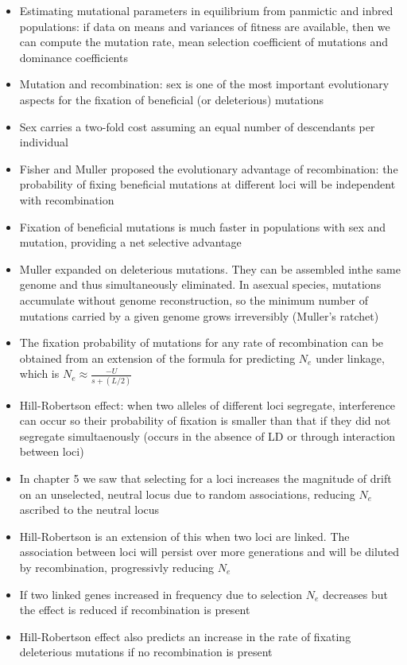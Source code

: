 \documentclass[12pt]{amsart}
\begin{document}
\begin{itemize}
\item Estimating mutational parameters in equilibrium from panmictic and inbred populations: if data on means and variances of fitness are available, then we can compute the mutation rate, mean selection coefficient of mutations and dominance coefficients
\item Mutation and recombination: sex is one of the most important evolutionary aspects for the fixation of beneficial (or deleterious) mutations
\item Sex carries a two-fold cost assuming an equal number of descendants per individual
\item Fisher and Muller proposed the evolutionary advantage of recombination: the probability of fixing beneficial mutations at different loci will be independent with recombination
\item Fixation of beneficial mutations is much faster in populations with sex and mutation, providing a net selective advantage
\item Muller expanded on deleterious mutations. They can be assembled inthe same genome and thus simultaneously eliminated. In asexual species, mutations accumulate without genome reconstruction, so the minimum number of mutations carried by a given genome grows irreversibly (Muller's ratchet) 
\item The fixation probability of mutations for any rate of recombination can be obtained from an extension of the formula for predicting $N_e$ under linkage, which is $N_e \approx\frac{-U}{s + (L/2)}$
\item Hill-Robertson effect: when two alleles of different loci segregate, interference can occur so their probability of fixation is smaller than that if they did not segregate simultaenously (occurs in the absence of LD or through interaction between loci)
\item In chapter 5 we saw that selecting for a loci increases the magnitude of drift on an unselected, neutral locus due to random associations, reducing $N_e$ ascribed to the neutral locus 
\item Hill-Robertson is an extension of this when two loci are linked. The association between loci will persist over more generations and will be diluted by recombination, progressivly reducing $N_e$
\item If two linked genes increased in frequency due to selection $N_e$ decreases but the effect is reduced if recombination is present
\item Hill-Robertson effect also predicts an increase in the rate of fixating deleterious mutations if no recombination is present 
\end{itemize}
\end{document}
